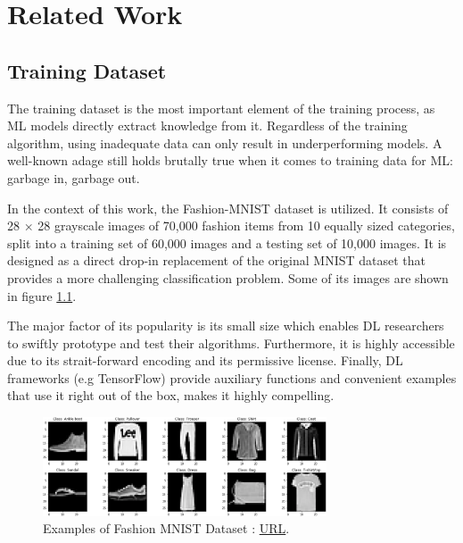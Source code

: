 \chapter{Related Work}
\label{Chapter-Related-Work}
\section{Training Dataset}
\label{sec:training_dataset}
The training dataset is the most important element of the training process, as ML models directly extract knowledge from it. Regardless of the training algorithm, using inadequate data can only result in underperforming models. A well-known adage still holds brutally true when it comes to training data for ML: garbage in, garbage out.

In the context of this work, the Fashion-MNIST \cite{fashion_mnist} dataset is utilized. It consists of 28 \(\times\) 28 grayscale images of 70,000 fashion items from 10 equally sized categories, split into a training set of 60,000 images and a testing set of 10,000 images. It is designed as a direct drop-in replacement of the original MNIST dataset \cite{digits_mnist} that provides a more challenging classification problem. Some of its images are shown in figure \ref{fig:Fashion_MNIST_dataset}.

The major factor of its popularity is its small size which enables DL researchers to swiftly prototype and test their algorithms. Furthermore, it is highly accessible due to its strait-forward encoding and its permissive license. Finally, DL frameworks (e.g TensorFlow) provide auxiliary functions and convenient examples that use it right out of the box, makes it highly compelling.
\begin{figure}[H]
    \centering
        \includegraphics[width=0.75\textwidth]{Images/Examples_Fashion_MNIST.png}
        \decoRule
        \caption[Examples of Fashion MNIST Dataset]{Examples of Fashion MNIST Dataset \cite{examples_fashion_MNIST}: \href{https://www.bouvet.no/bouvet-deler/understanding-convolutional-neural-networks-part-2}{URL}.}
        \label{fig:Fashion_MNIST_dataset}
\end{figure}


